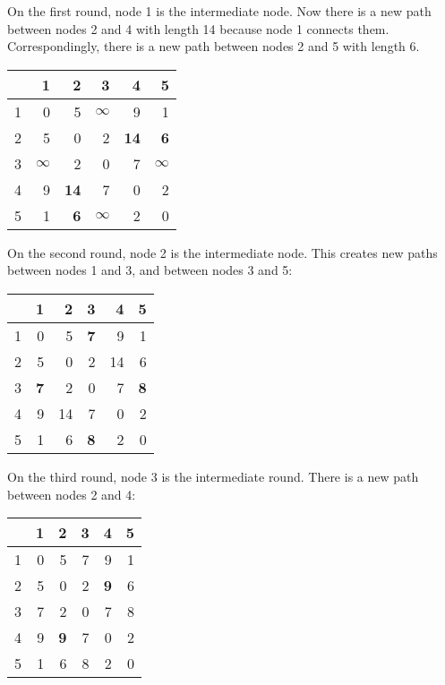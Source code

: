 On the first round, node 1 is the intermediate node.
Now there is a new path between nodes 2 and 4
with length 14 because node 1 connects them.
Correspondingly, there is a new path 
between nodes 2 and 5 with length 6.

\begin{center}
\begin{tabular}{r|rrrrr}
 & 1 & 2 & 3 & 4 & 5 \\
\hline
1 & 0 & 5 & $\infty$ & 9 & 1 \\
2 & 5 & 0 & 2 & \textbf{14} & \textbf{6} \\
3 & $\infty$ & 2 & 0 & 7 & $\infty$ \\
4 & 9 & \textbf{14} & 7 & 0 & 2 \\
5 & 1 & \textbf{6} & $\infty$ & 2 & 0 \\
\end{tabular}
\end{center}
\vspace{10pt}

On the second round, node 2 is the intermediate node.
This creates new paths between nodes 1 and 3,
and between nodes 3 and 5:

\begin{center}
\begin{tabular}{r|rrrrr}
 & 1 & 2 & 3 & 4 & 5 \\
\hline
1 & 0 & 5 & \textbf{7} & 9 & 1 \\
2 & 5 & 0 & 2 & 14 & 6 \\
3 & \textbf{7} & 2 & 0 & 7 & \textbf{8} \\
4 & 9 & 14 & 7 & 0 & 2 \\
5 & 1 & 6 & \textbf{8} & 2 & 0 \\
\end{tabular}
\end{center}
\vspace{10pt}

On the third round, node 3 is the intermediate round.
There is a new path between nodes 2 and 4:

\begin{center}
\begin{tabular}{r|rrrrr}
 & 1 & 2 & 3 & 4 & 5 \\
\hline
1 & 0 & 5 & 7 & 9 & 1 \\
2 & 5 & 0 & 2 & \textbf{9} & 6 \\
3 & 7 & 2 & 0 & 7 & 8 \\
4 & 9 & \textbf{9} & 7 & 0 & 2 \\
5 & 1 & 6 & 8 & 2 & 0 \\
\end{tabular}
\end{center}
\vspace{10pt}

